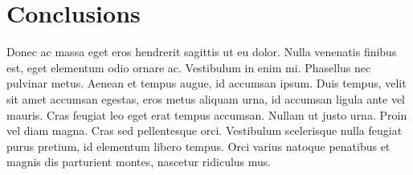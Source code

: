 \hypertarget{conclusions}{%
\section{Conclusions}\label{conclusions}}

Donec ac massa eget eros hendrerit sagittis ut eu dolor. Nulla venenatis
finibus est, eget elementum odio ornare ac. Vestibulum in enim mi.
Phasellus nec pulvinar metus. Aenean et tempus augue, id accumsan ipsum.
Duis tempus, velit sit amet accumsan egestas, eros metus aliquam urna,
id accumsan ligula ante vel mauris. Cras feugiat leo eget erat tempus
accumsan. Nullam ut justo urna. Proin vel diam magna. Cras sed
pellentesque orci. Vestibulum scelerisque nulla feugiat purus pretium,
id elementum libero tempus. Orci varius natoque penatibus et magnis dis
parturient montes, nascetur ridiculus mus.
